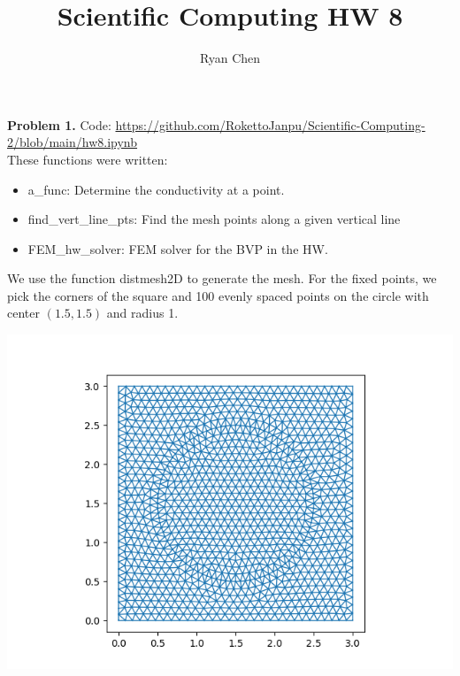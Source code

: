 \documentclass{article}
\title{Scientific Computing HW 8}
\author{Ryan Chen}
\def\tbf#1{\textbf{#1}}
\begin{document}
	
\maketitle



\tbf{Problem 1.} Code: \url{https://github.com/RokettoJanpu/Scientific-Computing-2/blob/main/hw8.ipynb}\\

These functions were written:
\begin{itemize}
	\item a\_func: Determine the conductivity at a point.
	\item find\_vert\_line\_pts: Find the mesh points along a given vertical line
	\item FEM\_hw\_solver: FEM solver for the BVP in the HW.
\end{itemize}

We use the function distmesh2D to generate the mesh. For the fixed points, we pick the corners of the square and 100 evenly spaced points on the circle with center $(1.5,1.5)$ and radius 1.
\begin{center}
	\includegraphics[scale=.5]{hw8 mesh}
\end{center}
\end{document}
